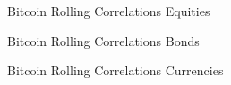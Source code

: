 \documentclass[aspectratio=169]{beamer}
\begin{document}
\begin{frame}{Bitcoin Rolling Correlations}
Equities
\begin{figure}
	\centering
	\noindent{}
\end{figure}
\end{frame}
\begin{frame}{Bitcoin Rolling Correlations}
Bonds
\begin{figure}
	\centering
	\noindent{}
\end{figure}
\end{frame}
\begin{frame}{Bitcoin Rolling Correlations}
Currencies
	\begin{figure}
		\centering
		\noindent{}
	\end{figure}
	\end{frame}
\end{document}
